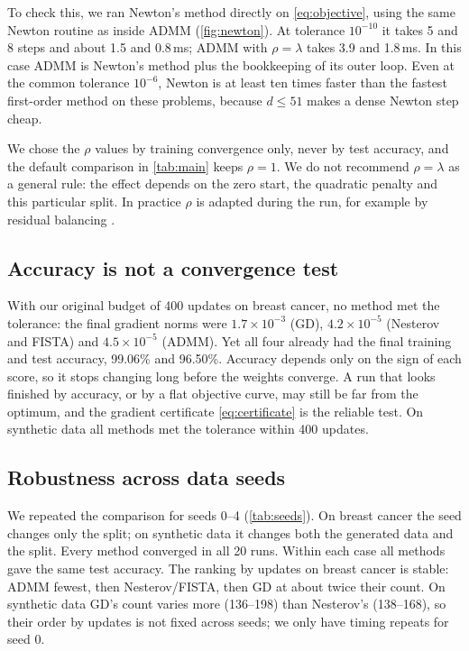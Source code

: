\documentclass{article}
\begin{document}
To check this, we ran Newton's method directly on \eqref{eq:objective}, using the same Newton routine as inside ADMM (\cref{fig:newton}). At tolerance $10^{-10}$ it takes 5 and 8 steps and about 1.5 and 0.8\,ms; ADMM with $\rho=\lambda$ takes 3.9 and 1.8\,ms. In this case ADMM is Newton's method plus the bookkeeping of its outer loop. Even at the common tolerance $10^{-6}$, Newton is at least ten times faster than the fastest first-order method on these problems, because $d\le51$ makes a dense Newton step cheap.

We chose the $\rho$ values by training convergence only, never by test accuracy, and the default comparison in \cref{tab:main} keeps $\rho=1$. We do not recommend $\rho=\lambda$ as a general rule: the effect depends on the zero start, the quadratic penalty and this particular split. In practice $\rho$ is adapted during the run, for example by residual balancing \citep{boyd2011admm}.

\subsection{Accuracy is not a convergence test}
\label{sec:budget}
With our original budget of 400 updates on breast cancer, no method met the tolerance: the final gradient norms were $1.7\times10^{-3}$ (GD), $4.2\times10^{-5}$ (Nesterov and FISTA) and $4.5\times10^{-5}$ (ADMM). Yet all four already had the final training and test accuracy, 99.06\% and 96.50\%. Accuracy depends only on the sign of each score, so it stops changing long before the weights converge. A run that looks finished by accuracy, or by a flat objective curve, may still be far from the optimum, and the gradient certificate \eqref{eq:certificate} is the reliable test. On synthetic data all methods met the tolerance within 400 updates.

\subsection{Robustness across data seeds}
We repeated the comparison for seeds 0--4 (\cref{tab:seeds}). On breast cancer the seed changes only the split; on synthetic data it changes both the generated data and the split. Every method converged in all 20 runs. Within each case all methods gave the same test accuracy. The ranking by updates on breast cancer is stable: ADMM fewest, then Nesterov/FISTA, then GD at about twice their count. On synthetic data GD's count varies more (136--198) than Nesterov's (138--168), so their order by updates is not fixed across seeds; we only have timing repeats for seed 0.
\end{document}
